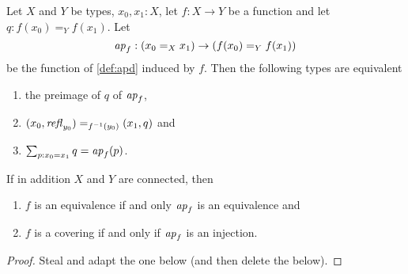 \begin{lemma}
  \label{lem:eqandcovofconntypes}
  Let $X$ and $Y$ be types, $x_0,x_1:X$, let $f:X\to Y$ be a function and let $q:f(x_0)=_Yf(x_1)$. Let 
    $$%
\ap f:(x_0=_Xx_1)\to (f(x_0)=_Yf(x_1))$$
be the function of \cref{def:apd} induced by $f$.  Then the following types are equivalent
  \begin{enumerate}
  \item the preimage of $q$ of $\mathop{{\it ap}_{f}}$,  
  \item $(x_0,\mathop{{\it refl}_{y_0}})=_{f^{-1}(y_0)}(x_1,q)$ and
  \item $\sum_{p:x_0=x_1}q=\mathop{{\it ap}_{f}}(p)$.
  \end{enumerate}
If in addition $X$ and $Y$ are connected, then
\begin{enumerate}
\item $f$ is an equivalence if and only $\ap f%
$ is an equivalence and
\item $f$ is a covering if and only if  $\ap f%
$ is an injection.
\end{enumerate}

\end{lemma}
\begin{proof}
  Steal and adapt the one below (and then delete the below).
\end{proof}


